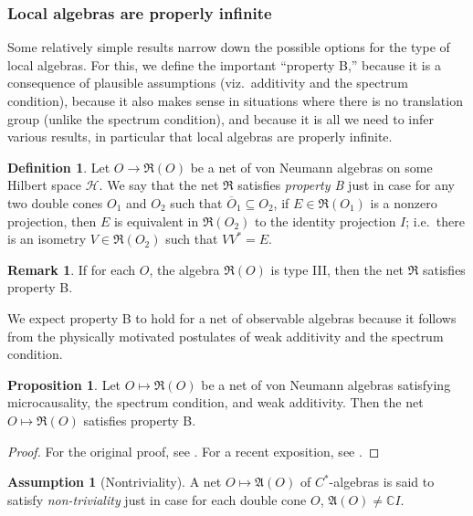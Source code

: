 \documentclass[12pt]{article}
\newcommand{\alg}[1]{\mathfrak{#1}}
\theoremstyle{definition}
\newtheorem{assumption}{Assumption}
\newtheorem{prop}[thm]{Proposition}
\theoremstyle{definition}
\newtheorem{defn}[thm]{Definition}
\newtheorem{note}[thm]{Remark}
\theoremstyle{remark}
\def\2#1{{\mathcal #1}}
\def\7#1{{\mathbb #1}}
\def\ol#1{{\overline #1}}
\begin{document}
\subsubsection{Local algebras are properly infinite}

Some relatively simple results narrow down the possible options for
the type of local algebras.  For this, we define the important
``property B,'' because it is a consequence of plausible assumptions
(viz.\ additivity and the spectrum condition), because it also makes
sense in situations where there is no translation group (unlike the
spectrum condition), and because it is all we need to infer various
results, in particular that local algebras are properly infinite.

\begin{defn} Let $O\to \alg{R}(O)$ be a net of von Neumann algebras on
  some Hilbert space $\2H$.  We say that the net $\alg{R}$ satisfies
  \emph{property B} just in case for any two double cones $O_1$ and
  $O_2$ such that $\ol {O}_1\subseteq O_2$, if $E\in \alg{R}(O_1)$ is
  a nonzero projection, then $E$ is equivalent in $\alg{R}(O_2)$ to
  the identity projection $I$; i.e.\ there is an isometry $V\in
  \alg{R}(O_2)$ such that $VV^*=E$.
\end{defn}

\begin{note} If for each $O$, the algebra $\alg{R}(O)$ is type III, then the net
  $\alg{R}$ satisfies property B.  \end{note}

We expect property B to hold for a net of observable algebras because
it follows from the physically motivated postulates of weak additivity
and the spectrum condition.

\begin{prop} Let $O\mapsto \alg{R}(O)$ be a net of von Neumann
  algebras satisfying microcausality, the spectrum condition, and weak
  additivity.  Then the net $O\mapsto \alg{R}(O)$ satisfies property
  B. \label{prop-B}
\end{prop}

\begin{proof} For the original proof, see \cite{borch}.  For a recent exposition, see
  \cite{antoni}. \end{proof}

\begin{assumption}[Nontriviality] A net $O\mapsto \alg{A}(O)$ of
  $C^*$-algebras is said to satisfy \emph{non-triviality} just in case
  for each double cone $O$, $\alg{A}(O)\neq \7C I$.
\end{assumption}
\end{document}
